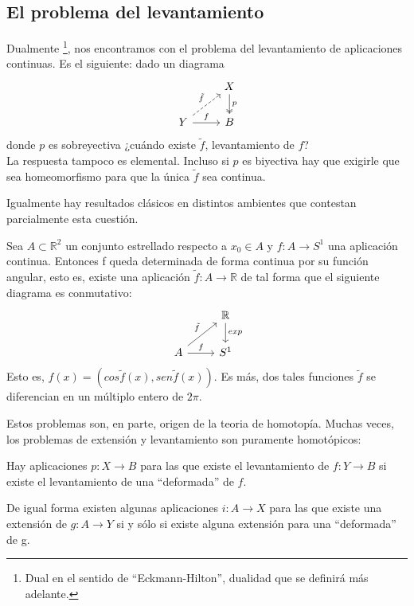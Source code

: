 \subsection*{El problema del levantamiento}
Dualmente \footnote{Dual en el sentido de ``Eckmann-Hilton'', dualidad que se definirá más adelante.},
nos encontramos con el problema del levantamiento de aplicaciones continuas. Es el siguiente: dado un diagrama
$$
\begin{tikzcd}
	{}	& X \dar[two heads]{p} \\
	Y \urar[dashed]{\tilde{f}} \rar{f} & B
\end{tikzcd}
$$
donde $p$ es sobreyectiva ¿cuándo existe $\tilde{f}$, levantamiento de $f$?\\ 
La respuesta tampoco es elemental. Incluso si $p$ es biyectiva hay que exigirle que sea homeomorfismo para que la única $\tilde{f}$ sea continua.\par

Igualmente hay resultados clásicos en distintos ambientes que contestan parcialmente esta cuestión.

\begin{teor} 
Sea $A \subset \mathbb{R}^2$ un conjunto estrellado respecto a $x_{0} \in A$ y $f : A \rightarrow S^{1}$ una aplicación continua. Entonces f queda determinada de forma continua por su función angular, esto es, existe una aplicación $\tilde{f} : A \rightarrow \mathbb{R}$ de tal forma que el siguiente diagrama es conmutativo:
$$
\begin{tikzcd}
	{}	& \mathbb{R} \dar{exp} \\
	A \urar{\tilde{f}} \rar{f} & S^1
\end{tikzcd}
$$
Esto es, $f(x) = (cos\tilde{f}(x), sen\tilde{f}(x))$. Es más, dos tales funciones $\tilde{f}$ se diferencian en un múltiplo entero de $2\pi$.
\end{teor}

Estos problemas son, en parte, origen de la teoria de homotopía. Muchas veces, los problemas de extensión y levantamiento son puramente homotópicos: \par

Hay aplicaciones $p : X \rightarrow B$ para las que existe el levantamiento de $f : Y \rightarrow B$ si existe el levantamiento de una ``deformada'' de $f$. \par
De igual forma existen algunas aplicaciones $i : A \rightarrow X$ para las que existe una extensión de $g : A \rightarrow Y$ si y sólo si existe alguna extensión para una ``deformada'' de g. \par

